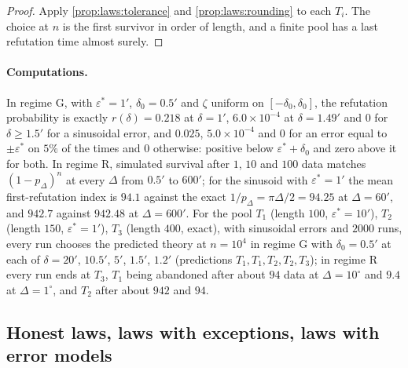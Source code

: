 \begin{proof}
Apply \cref{prop:laws:tolerance} and \cref{prop:laws:rounding} to each $T_i$. The choice at $n$ is the first survivor in order of length, and a finite pool has a last refutation time almost surely.
\end{proof}

\paragraph{Computations.} In regime G, with $\varepsilon^*=1'$, $\delta_0=0.5'$ and $\zeta$ uniform on $[-\delta_0,\delta_0]$, the refutation probability is exactly $r(\delta)=0.218$ at $\delta=1'$, $6.0\times10^{-4}$ at $\delta=1.49'$ and $0$ for $\delta\ge1.5'$ for a sinusoidal error, and $0.025$, $5.0\times10^{-4}$ and $0$ for an error equal to $\pm\varepsilon^*$ on $5\%$ of the times and $0$ otherwise: positive below $\varepsilon^*+\delta_0$ and zero above it for both. In regime R, simulated survival after $1$, $10$ and $100$ data matches $(1-p_\Delta)^n$ at every $\Delta$ from $0.5'$ to $600'$; for the sinusoid with $\varepsilon^*=1'$ the mean first-refutation index is $94.1$ against the exact $1/p_\Delta=\pi\Delta/2=94.25$ at $\Delta=60'$, and $942.7$ against $942.48$ at $\Delta=600'$. For the pool $T_1$ (length $100$, $\varepsilon^*=10'$), $T_2$ (length $150$, $\varepsilon^*=1'$), $T_3$ (length $400$, exact), with sinusoidal errors and $2000$ runs, every run chooses the predicted theory at $n=10^4$ in regime G with $\delta_0=0.5'$ at each of $\delta=20'$, $10.5'$, $5'$, $1.5'$, $1.2'$ (predictions $T_1,T_1,T_2,T_2,T_3$); in regime R every run ends at $T_3$, $T_1$ being abandoned after about $94$ data at $\Delta=10^\circ$ and $9.4$ at $\Delta=1^\circ$, and $T_2$ after about $942$ and $94$.

\subsection{Honest laws, laws with exceptions, laws with error models}\label{app:laws:honest}

